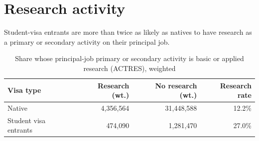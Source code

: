 \documentclass[11pt]{article}
\begin{document}
\section{Research activity}
Student-visa entrants are more than twice as likely as natives to have research as a primary or secondary activity on their principal job.
\begin{table}[H]
\centering
\caption{Share whose principal-job primary or secondary activity is basic or applied research (ACTRES), weighted}

\begin{tabular}{lrrr}
\toprule
Visa type & Research (wt.) & No research (wt.) & Research rate\\
\midrule
Native & 4,356,564 & 31,448,588 & 12.2\%\\
Student visa entrants & 474,090 & 1,281,470 & 27.0\%\\
\bottomrule
\end{tabular}
\end{table}
\end{document}

